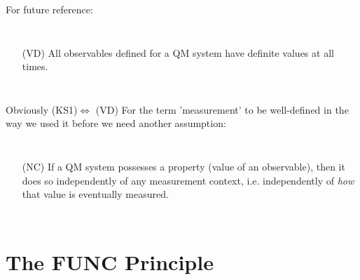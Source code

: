 \documentclass{beamer}
\begin{document}
\begin{frame}

For future reference:
\begin{columns}
\begin{enumerate}
\item [(VD)] All observables defined for a QM system have definite values at all times.
\end{enumerate}
\end{columns}
\vspace{10pt}
Obviously (KS1)$\iff$ (VD)
\vfill
For the term 'measurement' to be well-defined in the way we used it before we need another assumption:
\begin{columns}
\begin{enumerate}
\item [(NC)] If a QM system possesses a property (value of an observable), then it does so independently of any measurement context, i.e. independently of \textit{how} that value is eventually measured. 
\end{enumerate}
\end{columns}
\end{frame}


\section{The FUNC Principle}
\end{document}
